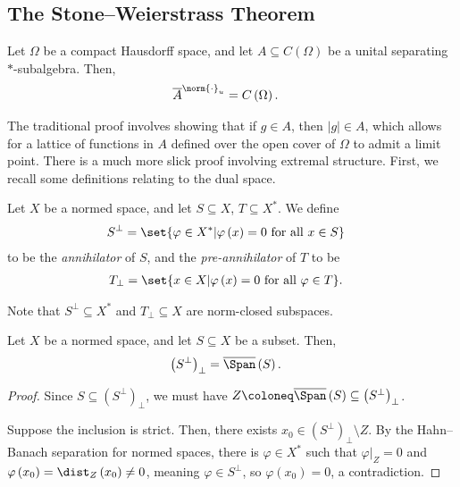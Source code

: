 \documentclass[10pt]{mypackage}
\begin{document}
\subsection{The Stone--Weierstrass Theorem}%
\begin{theorem}
  Let $\Omega$ be a compact Hausdorff space, and let $A\subseteq C\left( \Omega \right)$ be a unital separating $\ast$-subalgebra. Then,
  \begin{align*}
    \overline{A}^{\norm{\cdot}_{u}} &= C\left( \Omega \right).
  \end{align*}
\end{theorem}
The traditional proof involves showing that if $g\in A$, then $\left\vert g \right\vert\in A$, which allows for a lattice of functions in $A$ defined over the open cover of $\Omega$ to admit a limit point. There is a much more slick proof involving extremal structure. First, we recall some definitions relating to the dual space.
\begin{definition}
  Let $X$ be a normed space, and let $S\subseteq X$, $T\subseteq X^{\ast}$. We define
  \begin{align*}
    S^{\perp} &= \set{\varphi\in X^{\ast} | \varphi\left( x \right) = 0\text{ for all }x\in S}
  \end{align*}
  to be the \textit{annihilator} of $S$, and the \textit{pre-annihilator} of $T$ to be
  \begin{align*}
    T_{\perp} &= \set{x\in X | \varphi\left( x \right) = 0\text{ for all }\varphi\in T}.
  \end{align*}
\end{definition}
Note that $S^{\perp}\subseteq X^{\ast}$ and $T_{\perp}\subseteq X$ are norm-closed subspaces.
\begin{corollary}
  Let $X$ be a normed space, and let $S\subseteq X$ be a subset. Then,
  \begin{align*}
    \left( S^{\perp} \right)_{\perp} &= \overline{\Span}\left( S \right).
  \end{align*}
\end{corollary}
\begin{proof}
  Since $S\subseteq \left( S^{\perp} \right)_{\perp}$, we must have $Z\coloneq \overline{\Span}\left( S \right)\subseteq \left( S^{\perp} \right)_{\perp}$.\newline

  Suppose the inclusion is strict. Then, there exists $x_0\in \left( S^{\perp} \right)_{\perp}\setminus Z$. By the Hahn--Banach separation for normed spaces, there is $\varphi\in X^{\ast}$ such that $\varphi|_{Z} = 0$ and $\varphi\left( x_0 \right) = \dist_{Z}\left( x_0 \right)\neq 0$, meaning $\varphi\in S^{\perp}$, so $\varphi\left( x_0 \right)= 0$, a contradiction.
\end{proof}
\end{document}
